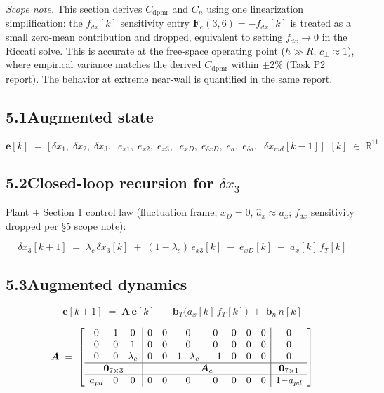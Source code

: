 \documentclass[11pt]{article}
\newcommand{\T}{^{\top}}
\newcommand{\lc}{\lambda_c}
\begin{document}
\emph{Scope note.} This section derives $C_{\mathrm{dpmr}}$ and $C_n$
using one linearization simplification: the $f_{dx}[k]$ sensitivity
entry $\bm{F}_e(3,6) = -f_{dx}[k]$ is treated as a small zero-mean
contribution and dropped, equivalent to setting $f_{dx} \!\to\! 0$ in
the Riccati solve. This is accurate at the free-space operating point
($h \!\gg\! R$, $c_\perp \!\approx\! 1$), where empirical variance
matches the derived $C_{\mathrm{dpmr}}$ within $\pm 2\%$ (Task P2 report).
The behavior at extreme near-wall is quantified in the same report.

\subsection*{5.1\quad Augmented state}

\[
\bm{e}[k] \;=\; \bigl[\,
  \delta x_1,\; \delta x_2,\; \delta x_3,\;\;
  e_{x1},\; e_{x2},\; e_{x3},\;\;
  e_{xD},\; e_{\delta xD},\; e_{a},\; e_{\delta a},\;\;
  \delta x_{md}[k\!-\!1]
\,\bigr]\T[k]
\;\in\; \mathbb{R}^{11}
\]



\subsection*{5.2\quad Closed-loop recursion for $\delta x_3$}

Plant $+$ Section 1 control law (fluctuation frame, $x_D\!=\!0$, $\hat{a}_x \!\approx\! a_x$; $f_{dx}$ sensitivity dropped per §5 scope note):

\begin{equation}
\delta x_3[k\!+\!1] \;=\; \lc\,\delta x_3[k]
   \;+\; (1{-}\lc)\,e_{x3}[k]
   \;-\; e_{xD}[k]
   \;-\; a_x[k]\,f_T[k]
\end{equation}

\subsection*{5.3\quad Augmented dynamics}

\begin{equation}
\bm{e}[k\!+\!1] \;=\; \bm{A}\,\bm{e}[k]
  \;+\; \bm{b}_T\bigl(a_x[k]\,f_T[k]\bigr)
  \;+\; \bm{b}_n\,n[k]
\end{equation}



\[
\bm{A} \;=\;
\left[\begin{array}{ccc|ccccccc|c}
0 & 1 & 0   & 0 & 0 & 0 & 0 & 0 & 0 & 0 & 0 \\
0 & 0 & 1   & 0 & 0 & 0 & 0 & 0 & 0 & 0 & 0 \\
0 & 0 & \lc & 0 & 0 & 1{-}\lc & {-}1 & 0 & 0 & 0 & 0 \\
\hline
\multicolumn{3}{c|}{\bm{0}_{7\times 3}} & \multicolumn{7}{c|}{\bm{A}_e} & \multicolumn{1}{c}{\bm{0}_{7\times 1}} \\
\hline
a_{pd} & 0 & 0 & 0 & 0 & 0 & 0 & 0 & 0 & 0 & 1{-}a_{pd}
\end{array}\right]
\]
\end{document}
